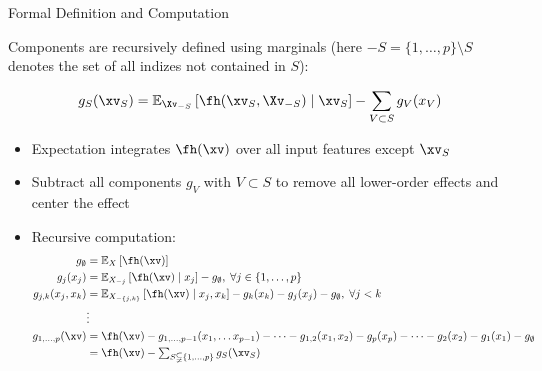 \documentclass[11pt,compress,t,notes=noshow, aspectratio=169, xcolor=table]{beamer}
\newcommand{\open}{}
\newcommand{\close}{}
\begin{document}
\begin{frame}{Formal Definition and Computation
}

Components are recursively defined using marginals (here $-S = \{1, \ldots, p \} \setminus S$ denotes the set of all indizes not contained in \(S\)):

$$g_{S}(\xv_S) = \mathbb{E}_{\Xv_{-S}} \left[\fh(\xv_S, \Xv_{-S}) \; \middle\vert \; \xv_S \right] - \sum_{V \subset S} g_V(x_V)$$

\begin{itemize}
    \item Expectation integrates $\fh(\xv)$ over all input features except $\xv_S$
    \item Subtract all components $g_V$ with $V \subset S$ to remove all lower-order effects and center the effect
\pause
\item Recursive computation:
\begin{align*}
 g_{\open \emptyset \close} &= \mathbb{E}_X\left[\fh(\xv)\right] \\
 g_{\open j \close}(x_j) &= \mathbb{E}_{X_{-j}}\left[\fh(\xv) \; \vert  \; x_j \right] - g_{\open \emptyset \close}, \; \forall j \in \{1, \ldots, p\} \\%
 g_{\open j, k \close}(x_j, x_k) &= \mathbb{E}_{X_{-\{ j,k \}}}\left[\fh(\xv) \; \vert \; x_j, x_k \right] - g_{\open k \close}(x_k) - g_{\open j \close}(x_j) - g_{\open \emptyset \close}, \; \forall j < k\\%
 &\vdots \\
 g_{\open 1, \dots, p \close}(\xv) &= \fh(\xv) -
 g_{\open 1, \dots, p-1 \close}(x_{1}, \dots x_{p-1}) - \dots - g_{\open 1, 2 \close}(x_1, x_2)
 - g_{\open p \close}(x_p)  - \dots - g_{\open 2 \close}(x_2) - g_{\open 1 \close}(x_1) - g_{\open \emptyset \close}\\
 &= \fh(\xv) -
 \textstyle\sum_{S \subsetneqq \{1,\ldots,p\}} g_{S}(\xv_S) 
\end{align*}

\end{itemize}
        
\end{frame}
\end{document}
